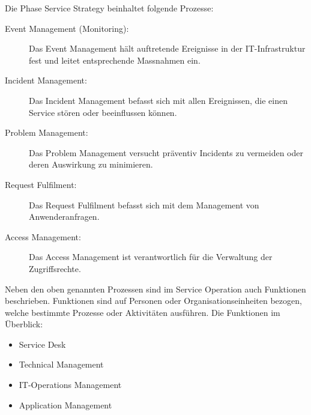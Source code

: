 Die Phase Service Strategy beinhaltet folgende Prozesse:
\begin{description}
	\item[Event Management (Monitoring):] Das Event Management hält auftretende Ereignisse in der IT-Infrastruktur fest und leitet entsprechende Massnahmen ein.
	\item[Incident Management:] Das Incident Management befasst sich mit allen Ereignissen, die einen Service stören oder beeinflussen können.
	\item[Problem Management:] Das Problem Management versucht präventiv Incidents zu vermeiden oder deren Auswirkung zu minimieren.
	\item[Request Fulfilment:] Das Request Fulfilment befasst sich mit dem Management von Anwenderanfragen.
	\item[Access Management:] Das Access Management ist verantwortlich für die Verwaltung der Zugriffsrechte.
\end{description}
Neben den oben genannten Prozessen sind im Service Operation auch Funktionen beschrieben. Funktionen sind auf Personen oder Organisationseinheiten bezogen, welche bestimmte Prozesse oder Aktivitäten ausführen. Die Funktionen im Überblick:
\begin{itemize}
	\item Service Desk
	\item Technical Management
    \item IT-Operations Management
	\item Application Management
\end{itemize}

